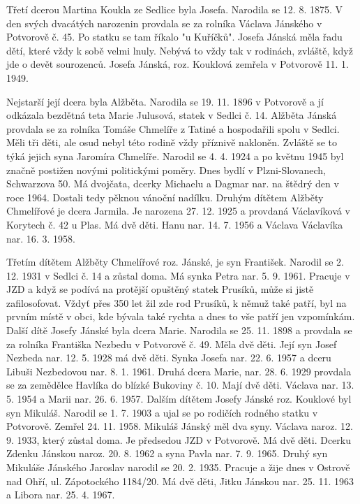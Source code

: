 \documentclass[../dejiny-rodu-prusiku.tex]{subfiles}
\begin{document}
Třetí dcerou Martina Koukla ze Sedlice byla Josefa. Narodila se 12. 8. 1875. V den svých dvacátých narozenin provdala se za rolníka Václava Jánského v Potvorově č. 45. Po statku se tam říkalo "u Kuříčků". Josefa Jánská měla řadu dětí, které vždy k sobě velmi lnuly. Nebývá to vždy tak v rodinách, zvláště, když jde o devět sourozenců. Josefa Jánská, roz. Kouklová zemřela v Pot­vorově 11. 1. 1949.

Nejstarší její dcera byla Alžběta. Narodila se 19. 11. 1896 v Potvorově a jí odkázala bezdětná teta Marie Ju­lusová, statek v Sedlci č. 14. Alžběta Jánská provdala se za rolníka Tomáše Chmelíře z Tatiné a hospodařili spolu v Sedlci. Měli tři děti, ale osud nebyl této rodině
vždy příznivě nakloněn. Zvláště se to týká je­jich syna Jaromíra Chmelíře. Narodil se 4. 4. 1924 a po květnu 1945 byl značně postižen novými politickými poměry. Dnes bydlí v Plzni-Slovanech, Schwarzova 50. Má dvojčata, dcerky Michaelu a Dagmar nar. na štědrý den v roce 1964. Dostali tedy pěknou vánoční nadílku. Druhým dítětem Alžběty Chmelířové je dcera Jarmila. Je narozena 27. 12. 1925 a provdaná Václavíková v Kory­tech č. 42 u Plas. Má dvě děti. Hanu nar. 14. 7. 1956 a Václava Václavíka nar. 16. 3. 1958.

Třetím dítětem Alžběty Chmelířové roz. Jánské, je syn František. Narodil se 2. 12. 1931 v Sedlci č. 14 a zůstal doma. Má synka Petra nar. 5. 9. 1961. Pracuje v JZD a když se podívá na protější opuštěný statek Prusíků, může si jistě zafilosofovat. Vždyť přes 350 let žil zde rod Prusíků, k němuž také patří, byl na prvním místě v obci, kde bývala také rychta a dnes to vše patří jen vzpomínkám. Další dítě Josefy Jánské byla dcera Marie. Narodila se 25. 11. 1898 a provdala se za rolníka Fran­tiška Nezbedu v Potvorově č. 49. Měla dvě děti. Její syn Josef Nezbeda nar. 12. 5. 1928 má dvě děti. Synka Jo­sefa nar. 22. 6. 1957 a dceru Libuši Nezbedovou nar. 8. 1. 1961. Druhá dcera Marie, nar. 28. 6. 1929 provdala se za zemědělce Havlíka do blízké Bukoviny č. 10. Mají dvě děti. Václava nar. 13. 5. 1954 a Marii nar. 26. 6. 1957. Dalším dítětem Josefy Jánské roz. Kouklové byl syn Mi­kuláš. Narodil se 1. 7. 1903 a ujal se po rodičích rod­ného statku v Potvorově. Zemřel 24. 11. 1958. Mikuláš Ján­ský měl dva syny. Václava naroz. 12. 9. 1933, který zůstal doma. Je předsedou JZD v Potvorově. Má dvě děti. Dcerku Zdenku Jánskou naroz. 20. 8. 1962 a syna Pavla nar. 7. 9. 1965. Druhý syn Mikuláše Jánského Jaroslav narodil se 20. 2. 1935. Pracuje a žije dnes v Ostrově nad Ohří, ul. Zápotockého 1184/20. Má dvě děti, Jitku Jánskou nar. 25. 11. 1963 a Libora nar. 25. 4. 1967.
\end{document}
